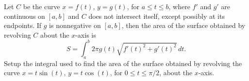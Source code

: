 \documentclass[../mathNotesPreamble]{subfiles}
\begin{document}
  \begin{ex*}
    Let $C$ be the curve $x=f(t)$, $y=g(t)$, for $a\leq t\leq b$, where $f'$ and $g'$ are continuous on $[a,b]$ and $C$ does not intersect itself, except possibly at its endpoints. If $g$ is nonnegative on $[a,b]$, then the area of the surface obtained by revolving $C$ about the $x$-axis is
      \[S=\int_a^b 2\pi g(t)\sqrt{f'(t)^2+g'(t)^2}\,dt.\]
    Setup the integral used to find the area of the surface obtained by revolving the curve $x=t\sin(t)$, $y=t\cos(t)$, for $0\leq t\leq \pi/2$, about the $x$-axis.
  \end{ex*}
  \pagebreak
\end{document}
